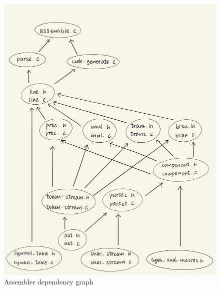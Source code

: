 \documentclass{article}
\begin{document}
\begin{figure}
    \centering
    \includegraphics[width=0.4\hsize]{./final_report_figure/assembler_dependency_graph}
    \caption{Assembler dependency graph}
    \label{fig:Assembler dependency graph}
\end{figure}
\end{document}
